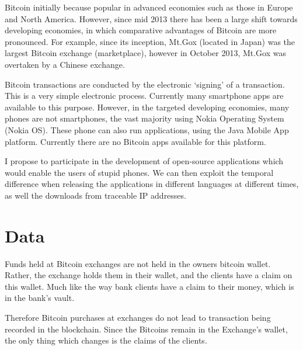 \documentclass[a4paper]{report}
\begin{document}
\begin{refsection}
Bitcoin initially because popular in advanced economies such as those in Europe and North America.
However, since mid 2013 there has been a large shift towards developing economies,
in which comparative advantages of Bitcoin are more pronounced.
For example, since its inception, Mt.Gox (located in Japan) was the largest Bitcoin exchange (marketplace), however in October 2013, Mt.Gox was overtaken by a Chinese exchange.

Bitcoin transactions are conducted by the electronic `signing' of a transaction.
This is a very simple electronic process.
Currently many smartphone apps are available to this purpose.
However, in the targeted developing economies, many phones are not smartphones, the vast majority using Nokia Operating System (Nokia OS).
 These phone can also run applications, using the Java Mobile App platform. Currently there are no Bitcoin apps available for this platform.

I propose to participate in the development of open-source applications which would enable the users of stupid phones.
We can then exploit the temporal difference when releasing the applications in different languages at different times,
as well the downloads from traceable IP addresses.

\section{Data}
\label{btc:data}
Funds held at Bitcoin exchanges are not held in the owners bitcoin wallet.
Rather, the exchange holds them in their wallet, and the clients have a claim on this wallet.
Much like the way bank clients have a claim to their money, which is in the bank's vault.

Therefore Bitcoin purchases at exchanges do not lead to transaction being recorded in the blockchain.
Since the Bitcoins remain in the Exchange's wallet, the only thing which changes is the claims of the clients.


\end{refsection}
\end{document}
